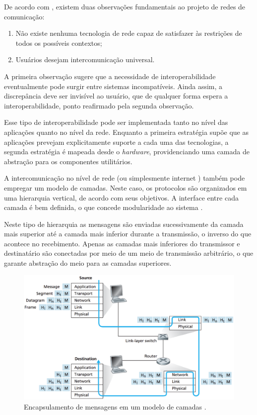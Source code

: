 \begin{apendicesenv}
De acordo com \cite{comer2000}, existem duas observações fundamentais ao projeto de
redes de comunicação:

\begin{enumerate}
  \item{Não existe nenhuma tecnologia de rede capaz de satisfazer às restrições de
        todos os possíveis contextos;}
  \item{Usuários desejam intercomunicação universal.}
\end{enumerate}

A primeira observação sugere que a necessidade de interoperabilidade eventualmente
pode surgir entre sistemas incompatíveis. Ainda assim, a discrepância deve ser
invisível ao usuário, que de qualquer forma espera a interoperabilidade, ponto
reafirmado pela segunda observação.

Esse tipo de interoperabilidade pode ser implementada tanto no nível das aplicações
quanto no nível da rede. Enquanto a primeira estratégia supõe que as aplicações
prevejam explicitamente suporte a cada uma das tecnologias, a segunda estratégia
é mapeada desde o \textit{hardware}, providenciando uma camada de abstração para os
componentes utilitários.

A intercomunicação no nível de rede (ou simplesmente internet \cite{comer2000})
também pode empregar um modelo de camadas. Neste caso, os protocolos são organizados
em uma hierarquia vertical, de acordo com seus objetivos. A interface entre cada
camada é bem definida, o que concede modularidade ao sistema \cite{kurose2012}.

Neste tipo de hierarquia as mensagens são enviadas sucessivamente da camada mais
superior até a camada mais inferior durante a transmissão, o inverso do que acontece
no recebimento. Apenas as camadas mais inferiores do transmissor e destinatário são
conectadas por meio de um meio de transmissão arbitrário, o que garante abstração do
meio para as camadas superiores.

\begin{figure}[h]
	\centering
		\includegraphics[keepaspectratio=true,scale=0.6]{figuras/encapsulamento.eps}
	\caption[Encapsulamento de mensagens entre camadas \cite{kurose2012}.]
          {Encapsulamento de mensagens em um modelo de camadas \cite{kurose2012}.}
	\label{fig:encapsulamento}
\end{figure}


\end{apendicesenv}
